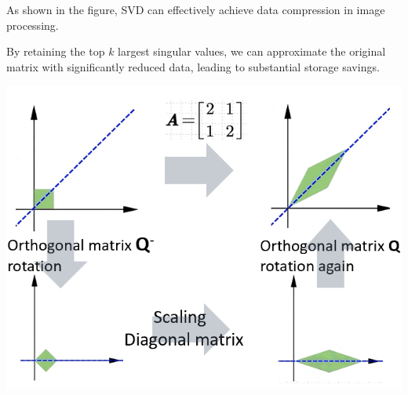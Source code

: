 \documentclass[a1paper,portrait,margin=0.8cm]{baposter}
\begin{document}
\begin{poster}
{\begin{minipage}[b]{0.48\textwidth}
\vspace{-1.5em}

As shown in the figure, SVD can effectively achieve data compression in image processing. 









\begin{minipage}[b]{0.43\textwidth}
By retaining the top $k$ largest singular values, we can approximate the original matrix with significantly reduced data, leading to substantial storage savings. 
\end{minipage}
\hfill
\begin{minipage}[b]{0.55\textwidth}
    \includegraphics[width=\linewidth+1em]{SVD.jpg}
\end{minipage}

\vspace{-0.8em}

\end{minipage}
\hfill
\begin{minipage}[b]{0.65\textwidth}

\vspace{0.1em}


\end{minipage}}
\end{poster}
\end{document}
